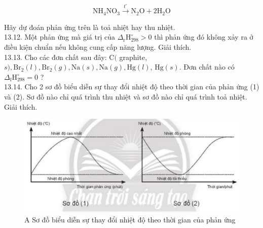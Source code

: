 \documentclass[10pt]{article}
\begin{document}
$$
\mathrm{NH}_{4} \mathrm{NO}_{3} \xrightarrow{t^{\circ}} \mathrm{N}_{2} \mathrm{O}+2 \mathrm{H}_{2} \mathrm{O}
$$

Hãy dự đoán phản ứng trên là toả nhiệt hay thu nhiệt.\\
13.12. Một phản ứng mà giá trị của $\Delta_{\mathrm{r}} \mathrm{H}_{298}^{\circ}>0$ thì phản ứng đó không xảy ra ở điều kiện chuẩn nếu không cung cấp năng lượng. Giải thích.\\
13.13. Cho các đơn chất sau đây: $\mathrm{C}($ graphite,$s), \mathrm{Br}_{2}(l), \mathrm{Br}_{2}(g), \mathrm{Na}(s), \mathrm{Na}(g), \mathrm{Hg}(l)$, $\mathrm{Hg}(s)$. Đơn chất nào có $\Delta_{\mathrm{f}} \mathrm{H}_{298}^{\circ}=0$ ?\\
13.14. Cho 2 sơ đồ biểu diễn sự thay đổi nhiệt độ theo thời gian của phản ứng (1) và (2). Sơ đồ nào chỉ quá trình thu nhiệt và sơ đồ nào chỉ quá trình toả nhiệt. Giải thích.

\begin{figure}[h]
\begin{center}
  \includegraphics[width=\textwidth]{2025_10_23_883c4b146e2332109fcdg-49}
\captionsetup{labelformat=empty}
\caption{A Sơ đồ biểu diễn sự thay đổi nhiệt độ theo thời gian của phản ứng}
\end{center}
\end{figure}
\end{document}
